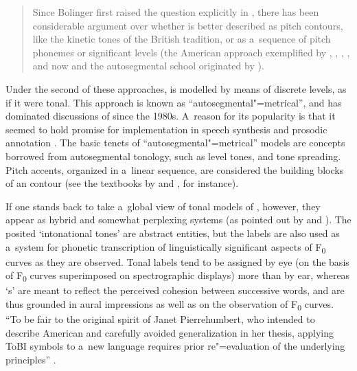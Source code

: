 \begin{quotation}
	Since Bolinger first raised the {question} explicitly in \citeyear{bolinger1951}, there has been considerable argument over whether  is better described as pitch contours, like the kinetic tones of the British tradition, or as a~sequence of pitch phonemes or significant levels (the American approach exemplified by \citealt{pike1945}, \citealt{wells1945}, \citealt{trageretal1951}, \citealt{hockett1955}, and now \citealt{liberman1975} and the autosegmental school originated by \citealt{goldsmith1976}). \citep[531]{ladd1978}
\end{quotation}

{\noindent}Under the second of these approaches,  is modelled by means of discrete levels, as if it were tonal. This approach is known as “autosegmental"=metrical”, and has dominated
discussions of  since the 1980s. A~reason for its popularity is that it seemed to hold promise for implementation in speech synthesis \citep{pierrehumbert1981} and prosodic annotation \citep{silvermanetal1992}. The basic tenets of “autosegmental"=metrical” models are concepts borrowed from autosegmental tonology, such as level
tones,  and tone spreading. Pitch accents, organized in a~linear sequence, are considered the building blocks of an  {contour} (see the textbooks by \citealt{ladd1996} and \citealt{gussenhoven2004}, for instance).

If one stands back to take a~global view of tonal models of , however, they appear as hybrid and
somewhat perplexing systems (as pointed out by \citealt{martin2001} and \citealt{wightman2002}). The posited ‘intonational tones' are abstract
entities, but the labels are also used as a~system for phonetic transcription of linguistically
significant aspects of F\textsubscript{0} curves as they are observed. Tonal labels tend to be assigned by eye (on the basis of F\textsubscript{0} curves superimposed on spectrographic displays) more than by ear,
whereas ‘s' are meant to reflect the perceived cohesion between successive words, and
are thus grounded in aural impressions as well as on the observation of F\textsubscript{0} curves. “To be fair to the original spirit of Janet Pierrehumbert, who intended to describe
American  and carefully avoided generalization in her thesis, applying ToBI symbols to a~new
language requires prior re"=evaluation of the underlying principles” \citep{vaissiere2002}.

